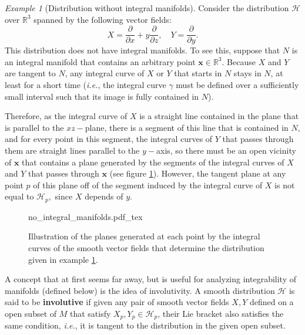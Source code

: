 \documentclass[12pt, letterpaper, reqno]{amsart}
\newcommand{\incfig}[2][1]{%
    \def\svgwidth{#1\columnwidth}
    {#2.pdf_tex}
}
\theoremstyle{definition}
\theoremstyle{plain}
\theoremstyle{remark}
\newtheorem{ex}{Example}
\begin{document}
\begin{ex}[Distribution without integral manifolds] \label{ex:no_integral_manifolds}
	Consider the distribution $ \mathcal{H} $ over $ \mathbb{R}^3 $ spanned by the following vector fields: 
	$$ X = \frac{\partial}{\partial x} + y \frac{\partial}{\partial z}, \quad Y = \frac{\partial}{\partial y}.  $$ 
	This distribution does not have integral manifolds. To see this, suppose that $ N $ is an integral manifold that contains an arbitrary point $ \textbf{x} \in \mathbb{R}^3.  $ Because $ X $ and $ Y $ are tangent to $ N $, any integral curve of $ X $ or $ Y $ that starts in $ N $ stays in $ N $, at least for a short time (\textit{i.e.}, the integral curve $ \gamma $ must be defined over a sufficiently small interval such that its image is fully contained in $ N $).   

	Therefore, as the integral curve of $ X $ is a straight line contained in the plane that is parallel to the $ xz- $plane, there is a segment of this line that is contained in $ N $, and for every point in this segment, the integral curves of $ Y $ that passes through them are straight lines parallel to the $ y- $axis, so there must be an open vicinity of $ \textbf{x}  $ that contains a plane generated by the segments of the integral curves of $ X $ and $ Y $ that passes through $ \textbf{x}$ (see figure \ref{fig:no_integral_manifolds}). However, the tangent plane at any point $ p $  of this plane  off of the segment induced by the integral curve of $ X $ is not equal to $ \mathcal{H}_p, $ since $ X $ depends of $ y $.   
\end{ex}

\begin{figure}
    \centering
    \incfig{no_integral_manifolds}
    \caption{Illustration of the planes generated at each point by the integral curves of the smooth vector fields that determine the distribution given in example \ref{ex:no_integral_manifolds}.}
    \label{fig:no_integral_manifolds}
\end{figure}

A concept that at first seems far away, but is useful for analyzing integrability of manifolds (defined below) is the idea of involutivity. A smooth distribution $ \mathcal{H} $ is said to be \textbf{involutive} if given any pair of smooth vector fields $ X,Y $ defined on a open subset of $ M $  that satisfy $X_p,Y_p\in \mathcal{H}_p $, their Lie bracket also satisfies the same condition, \textit{i.e.}, it is tangent to the distribution in the given open subset. 
\end{document}
